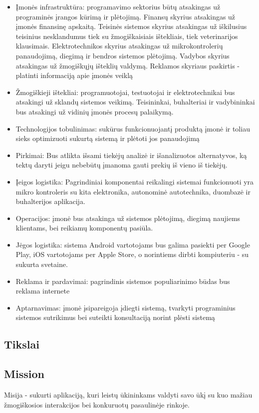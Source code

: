 \documentclass[oneside]{VUMIFPSkursinis}
\begin{document}
	\begin{itemize}
		\item{Įmonės infrastruktūra: programavimo sektorius būtų atsakingas už programinės įrangos kūrimą ir plėtojimą. Finansų skyrius atsakingas už įmonės finansinę apskaitą. Teisinės sistemos skyrius atsakingas už iškilusius teisinius nesklandumus tiek su žmogiškaisiais ištekliais, tiek veterinarijos klausimais. Elektrotechnikos skyrius atsakingas už mikrokontrolerių panaudojimą, diegimą ir bendros sistemos plėtojimą. Vadybos skyrius atsakingas už žmogiškųjų išteklių valdymą. Reklamos skyriaus paskirtis - platinti informaciją apie įmonės veiklą }
		\item{Žmogiškieji ištekliai: programuotojai, testuotojai ir elektrotechnikai bus atsakingi už sklandų sistemos veikimą. Teisininkai, buhalteriai ir vadybininkai bus atsakingi už vidinių įmonės procesų palaikymą. }
		\item{Technologijos tobulinimas: sukūrus funkcionuojantį produktą įmonė ir toliau sieks optimizuoti sukurtą sistemą ir plėtoti jos panaudojimą }
		\item{Pirkimai: Bus atlikta išsami tiekėjų analizė ir išanalizuotos alternatyvos, ką tektų daryti jeigu nebebūtų įmanoma gauti prekių iš vieno iš tiekėjų.}
		\item{Įeigos logistika: Pagrindiniai komponentai reikalingi sistemai funkcionuoti yra mikro kontroleris su kita elektronika, autonominė autotechnika, duombazė ir buhalterijos aplikacija.}
		\item{Operacijos: įmonė bus atsakinga už sistemos plėtojimą, diegimą naujiems klientams, bei reikiamų komponentų pasiūla.}
		\item{Jėgos logistika: sistema Android vartotojams bus galima pasiekti per Google Play, iOS vartotojams per Apple Store, o norintiems dirbti kompiuteriu - su sukurta svetaine.}
		\item{Reklama ir pardavimai: pagrindinis sistemos populiarinimo būdas bus reklama internete}
		\item{Aptarnavimas: įmonė įsipareigoja įdiegti sistemą, tvarkyti programinius sistemos sutrikimus bei suteikti konsultaciją norint plėsti sistemą }


	\end{itemize}

	
	\subsection{Tikslai}
\subsection{Mission}
Misija - sukurti aplikaciją, kuri leistų ūkininkams valdyti savo ūkį su kuo mažiau žmogiškosios interakcijos bei konkuruotų pasaulinėje rinkoje.
\end{document}
